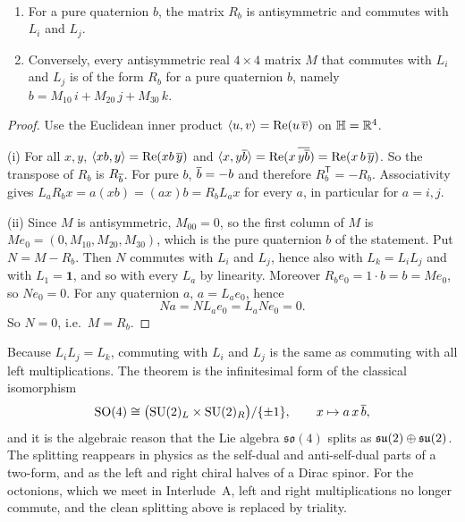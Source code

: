 \begin{theorem}\label{thm:commutant}\ver\
\begin{enumerate}[label=(\roman*)]
\item For a pure quaternion $b$, the matrix $R_b$ is antisymmetric and commutes with $L_i$ and $L_j$.
\item Conversely, every antisymmetric real $4\times4$ matrix $M$ that commutes with $L_i$ and $L_j$ is of the form $R_b$ for a pure quaternion $b$, namely $b=M_{10}\,i+M_{20}\,j+M_{30}\,k$.
\end{enumerate}
\end{theorem}
\begin{proof}
Use the Euclidean inner product $\langle u,v\rangle=\operatorname{Re}(u\,\overline{v})$ on $\mathbb{H}=\mathbb{R}^4$.

(i) For all $x,y$, $\langle xb,y\rangle=\operatorname{Re}(xb\,\overline{y})$ and $\langle x,y\overline{b}\rangle=\operatorname{Re}(x\,\overline{y\overline{b}})=\operatorname{Re}(x\,b\,\overline{y})$. So the transpose of $R_b$ is $R_{\overline{b}}$. For pure $b$, $\overline{b}=-b$ and therefore $R_b^{\mathsf T}=-R_b$. Associativity gives $L_aR_bx=a(xb)=(ax)b=R_bL_ax$ for every $a$, in particular for $a=i,j$.

(ii) Since $M$ is antisymmetric, $M_{00}=0$, so the first column of $M$ is $Me_0=(0,M_{10},M_{20},M_{30})$, which is the pure quaternion $b$ of the statement. Put $N=M-R_b$. Then $N$ commutes with $L_i$ and $L_j$, hence also with $L_k=L_iL_j$ and with $L_1=\mathbf 1$, and so with every $L_a$ by linearity. Moreover $R_be_0=1\cdot b=b=Me_0$, so $Ne_0=0$. For any quaternion $a$, $a=L_ae_0$, hence
\[
N a=N L_a e_0=L_a N e_0=0 .
\]
So $N=0$, i.e.\ $M=R_b$.
\end{proof}


Because $L_iL_j=L_k$, commuting with $L_i$ and $L_j$ is the same as commuting with all left multiplications. The theorem is the infinitesimal form of the classical isomorphism
\[
\mathrm{SO}(4)\cong\bigl(\mathrm{SU}(2)_L\times\mathrm{SU}(2)_R\bigr)/\{\pm1\},\qquad x\mapsto a\,x\,\overline{b} ,
\]
and it is the algebraic reason that the Lie algebra $\mathfrak{so}(4)$ splits as $\mathfrak{su}(2)\oplus\mathfrak{su}(2)$. The splitting reappears in physics as the self-dual and anti-self-dual parts of a two-form, and as the left and right chiral halves of a Dirac spinor. For the octonions, which we meet in Interlude~A, left and right multiplications no longer commute, and the clean splitting above is replaced by triality.

